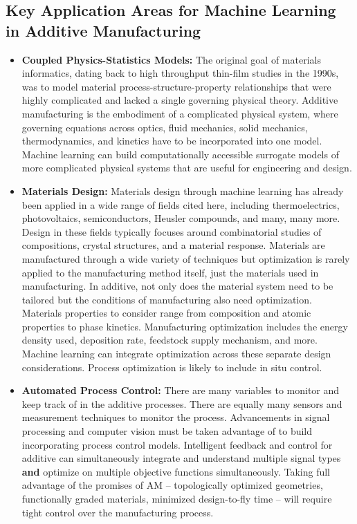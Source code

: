 \subsection{Key Application Areas for Machine Learning in Additive Manufacturing}
\begin{itemize}
	\item \textbf{Coupled Physics-Statistics Models:} The original goal of materials informatics, dating back to high throughput thin-film studies in the 1990s, was to model material process-structure-property relationships that were highly complicated and lacked a single governing physical theory. Additive manufacturing is the embodiment of a complicated physical system, where governing equations across optics, fluid mechanics, solid mechanics, thermodynamics, and kinetics have to be incorporated into one model. Machine learning can build computationally accessible surrogate models of more complicated physical systems that are useful for engineering and design. 
	
	\item \textbf{Materials Design:} Materials design through machine learning has already been applied in a wide range of fields cited here, including thermoelectrics, photovoltaics, semiconductors, Heusler compounds, and many, many more. Design in these fields typically focuses around combinatorial studies of compositions, crystal structures, and a material response. Materials are manufactured through a wide variety of techniques but optimization is rarely applied to the manufacturing method itself, just the materials used in manufacturing. In additive, not only does the material system need to be tailored but the conditions of manufacturing also need optimization. Materials properties to consider range from composition and atomic properties to phase kinetics. Manufacturing optimization includes the energy density used, deposition rate, feedstock supply mechanism, and more. Machine learning can integrate optimization across these separate design considerations. Process optimization is likely to include in situ control.
	
	\item \textbf{Automated Process Control:} There are many variables to monitor and keep track of in the additive processes. There are equally many sensors and measurement techniques to monitor the process. Advancements in signal processing and computer vision must be taken advantage of to build incorporating process control models. Intelligent feedback and control for additive can simultaneously integrate and understand multiple signal types \textbf{and} optimize on multiple objective functions simultaneously. Taking full advantage of the promises of AM -- topologically optimized geometries, functionally graded materials, minimized design-to-fly time -- will require tight control over the manufacturing process.
\end{itemize}


